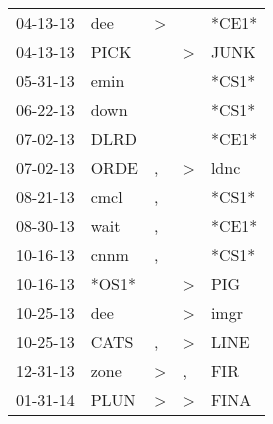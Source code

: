\begin{supertabular}{p{0.07\textwidth}p{0.06\textwidth}p{0.02\textwidth}p{0.02\textwidth}p{0.06\textwidth}}
          04-13-13\textsuperscript{} &            dee\textsuperscript{} &     \textgreater &                  &                            *CE1* \\
          04-13-13\textsuperscript{} &           PICK\textsuperscript{} &                  &     \textgreater &           JUNK\textsuperscript{} \\
          05-31-13\textsuperscript{} &           emin\textsuperscript{} &                  &                  &                            *CS1* \\
          06-22-13\textsuperscript{} &           down\textsuperscript{} &                  &                  &                            *CS1* \\
          07-02-13\textsuperscript{} &           DLRD\textsuperscript{} &                  &                  &                            *CE1* \\
          07-02-13\textsuperscript{} &           ORDE\textsuperscript{} &                , &     \textgreater &           ldnc\textsuperscript{} \\
          08-21-13\textsuperscript{} &           cmcl\textsuperscript{} &                , &                  &                            *CS1* \\
          08-30-13\textsuperscript{} &           wait\textsuperscript{} &                , &                  &                            *CE1* \\
          10-16-13\textsuperscript{} &           cnnm\textsuperscript{} &                , &                  &                            *CS1* \\
          10-16-13\textsuperscript{} &                            *OS1* &                  &     \textgreater &            PIG\textsuperscript{} \\
          10-25-13\textsuperscript{} &            dee\textsuperscript{} &                  &     \textgreater &           imgr\textsuperscript{} \\
          10-25-13\textsuperscript{} &           CATS\textsuperscript{} &                , &     \textgreater &           LINE\textsuperscript{} \\
          12-31-13\textsuperscript{} &           zone\textsuperscript{} &     \textgreater &                , &            FIR\textsuperscript{} \\
          01-31-14\textsuperscript{} &           PLUN\textsuperscript{} &     \textgreater &     \textgreater &           FINA\textsuperscript{} \\

\end{supertabular}
